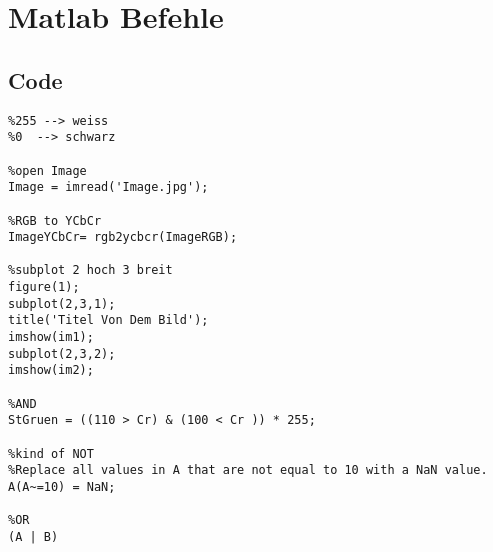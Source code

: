 \section{Matlab Befehle}
\subsection{Code}
\begin{lstlisting}
%255 --> weiss 
%0 	--> schwarz

%open Image
Image = imread('Image.jpg'); 

%RGB to YCbCr
ImageYCbCr= rgb2ycbcr(ImageRGB);

%subplot 2 hoch 3 breit
figure(1);
subplot(2,3,1);
title('Titel Von Dem Bild'); 
imshow(im1);
subplot(2,3,2);
imshow(im2);

%AND
StGruen = ((110 > Cr) & (100 < Cr )) * 255;

%kind of NOT
%Replace all values in A that are not equal to 10 with a NaN value.
A(A~=10) = NaN;

%OR
(A | B)
\end{lstlisting}


